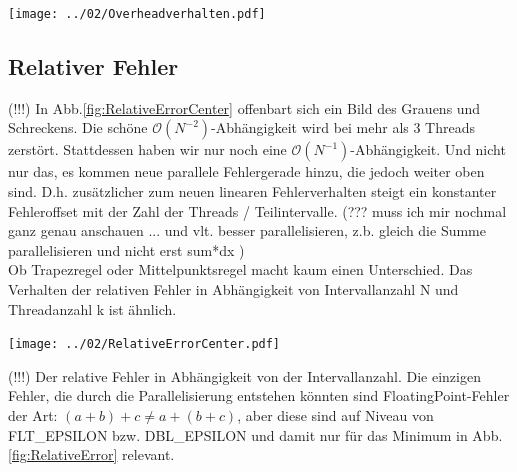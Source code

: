 \documentclass[12pt,a4paper]{article}
\begin{document}
\begin{center}
	\captionsetup{type=figure}
	\centering
	\begin{minipage}{0.7\linewidth}
		\texttt{[image: ../02/Overheadverhalten.pdf]}
	\end{minipage}
	\label{fig:Overheadverhalten}
\end{center}


\subsection{Relativer Fehler}

(!!!) In Abb.\ref{fig:RelativeErrorCenter} offenbart sich ein Bild des Grauens und Schreckens. Die schöne $\mathcal{O}(N^{-2})$-Abhängigkeit wird bei mehr als 3 Threads zerstört. Stattdessen haben wir nur noch eine $\mathcal{O}(N^{-1})$-Abhängigkeit. Und nicht nur das, es kommen neue parallele Fehlergerade hinzu, die jedoch weiter oben sind. D.h. zusätzlicher zum neuen linearen Fehlerverhalten steigt ein konstanter Fehleroffset mit der Zahl der Threads / Teilintervalle. (??? muss ich mir nochmal ganz genau anschauen ... und vlt. besser parallelisieren, z.b. gleich die Summe parallelisieren und nicht erst sum*dx )\\
Ob Trapezregel oder Mittelpunktsregel macht kaum einen Unterschied. Das Verhalten der relativen Fehler in Abhängigkeit von Intervallanzahl N und Threadanzahl k ist ähnlich.\\

\begin{center}
	\captionsetup{type=figure}
	\centering
	\begin{minipage}{0.7\linewidth}
		\texttt{[image: ../02/RelativeErrorCenter.pdf]}
	\end{minipage}
	\label{fig:RelativeErrorCenter}
\end{center}

(!!!)
Der relative Fehler in Abhängigkeit von der Intervallanzahl. Die einzigen Fehler, die durch die Parallelisierung entstehen könnten sind FloatingPoint-Fehler der Art: $(a+b)+c \neq a + (b+c)$, aber diese sind auf Niveau von FLT\_EPSILON bzw. DBL\_EPSILON und damit nur für das Minimum in Abb.\ref{fig:RelativeError} relevant.\\
\end{document}

